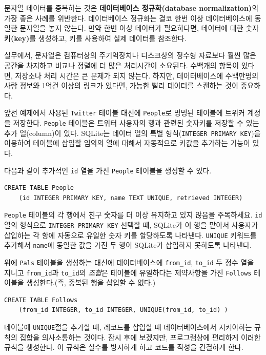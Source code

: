 문자열 데이터를 중복하는 것은 {\bf 데이터베이스 정규화(database normalization)}의 가장 좋은 사례를 위반한다.
데이터베이스 정규화는 결코 한번 이상 데이터베이스에 동일한 문자열을 놓지 않는다. 
만약 한번 이상 데이터가 필요하다면, 데이터에 대한 숫자 {\bf 키(key)}를 생성하고, 키를 사용하여 실제 데이터를 참조한다.

실무에서, 문자열은 컴퓨터상의 주기억장치나 디스크상의 정수형 자료보다 훨씬 많은 공간을 차지하고 비교나 정렬에 더 많은 처리시간이 소요된다.
수백개의 항목이 있다면, 저장소나 처리 시간은 큰 문제가 되지 않는다. 하지만, 데이터베이스에 수백만명의 사람 정보와 1억건 이상의 링크가 있다면,
가능한 빨리 데이터를 스캔하는 것이 중요하다.

앞선 예제에서 사용된 {\tt Twitter} 테이블 대신에 {\tt People}로 명명된 테이블에 트위커 계정을 저장한다.
{\tt People} 테이블은 트위터 사용자의 행과 관련된 숫자키를 저장할 수 있는 추가 열(column)이 있다.
SQLite는 데이터 열의 특별 형식({\tt INTEGER PRIMARY KEY})을 이용하여 테이블에 삽입할 임의의 열에 대해서 자동적으로 키값을 추가하는 기능이 있다.

다음과 같이 추가적인 {\tt id} 열을 가진 {\tt People} 테이블을 생성할 수 있다.

\beforeverb
\begin{verbatim}
CREATE TABLE People 
    (id INTEGER PRIMARY KEY, name TEXT UNIQUE, retrieved INTEGER)
\end{verbatim}
\afterverb
%

{\tt People} 테이블의 각 행에서 친구 숫자를 더 이상 유지하고 있지 않음을 주목하세요.
{\tt id} 열의 형식으로 {\tt INTEGER PRIMARY KEY} 선택할 때, SQLite가 이 행을 맡아서 
사용자가 삽입하는 각 항에 자동으로 유일한 숫자 키를 할당하도록 나타낸다.
{\tt UNIQUE} 키워드를 추가해서 {\tt name}에 동일한 값을 가진 두 행이 SQLite가 삽입하지 못하도록 나타낸다.

위에 {\tt Pals} 테이블을 생성하는 대신에 데이터베이스에 \verb"from_id", \verb"to_id" 두 정수 열을 지니고 
\verb"from_id"과 \verb"to_id"의 \emph{조합}은 테이블에 유일하다는 제약사항을 가진 {\tt Follows} 테이블을 생성한다.(즉, 중복된 행을 삽입할 수 없다.)

\beforeverb
\begin{verbatim}
CREATE TABLE Follows 
    (from_id INTEGER, to_id INTEGER, UNIQUE(from_id, to_id) )
\end{verbatim}
\afterverb
%

테이블에 {\tt UNIQUE}절을 추가할 때, 레코드를 삽입할 때 데이터베이스에서 지켜야하는 규칙의 집합을 의사소통하는 것이다.
잠시 후에 보겠지만, 프로그램상에 편리하게 이러한 규칙을 생성한다.
이 규칙은 실수를 방지하게 하고 코드를 작성을 간결하게 한다.

